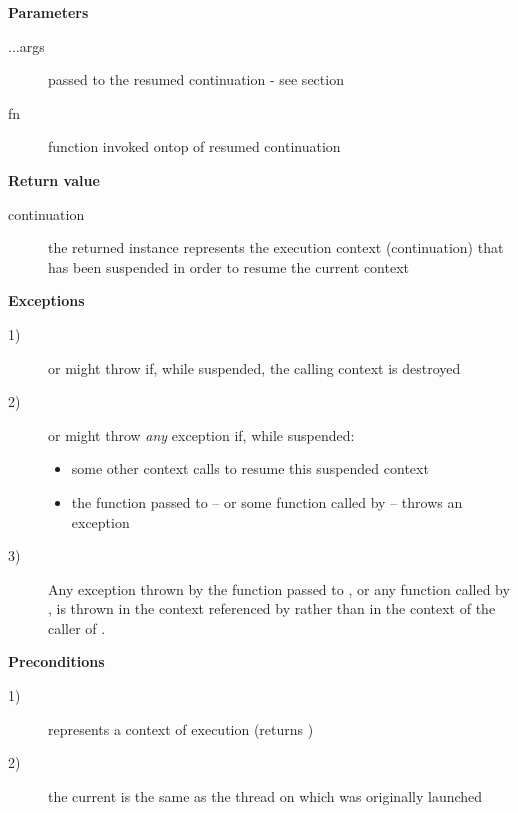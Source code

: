 {\bfseries Parameters}
\begin{description}
    \item[...args] passed to the resumed continuation - see section
    \item[fn] function invoked ontop of resumed continuation\\
\end{description}

{\bfseries Return value}
\begin{description}
    \item[continuation] the returned instance represents the execution context
                        (continuation) that has been suspended in order to
                        resume the current context
\end{description}

{\bfseries Exceptions}
\begin{description}
    \item[1)] \resume or \resumewith might
              throw \unwindex if, while suspended, the
              calling context is destroyed
    \item[2)] \resume or \resumewith might throw \emph{any}
              exception if, while suspended:
        \begin{itemize}
            \item some other context calls \resumewith to resume
              this suspended context
            \item the function  passed to \resumewith --
              or some function called by  -- throws an exception
        \end{itemize}
    \item[3)] Any exception thrown by the function  passed
              to \resumewith, or any function called by , is thrown in
              the context referenced by  rather than in the context
              of the caller of \resumewith.
\end{description}

{\bfseries Preconditions}
\begin{description}
    \item[1)]  represents a context of execution (\opbool returns
               )
    \item[2)] the current  is the same as the thread on
               which  was originally launched
\end{description}

